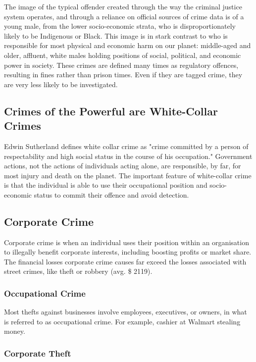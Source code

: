\documentclass{article}
\begin{document}
The image of the typical offender created through the way the criminal justice system operates, and through a reliance on official sources of crime data is of a young male, from the lower socio-economic strata, who is disproportionately likely to be Indigenous or Black. This image is in stark contrast to who is responsible for most physical and economic harm on our planet: middle-aged and older, affluent, white males holding positions of social, political, and economic power in society. These crimes are defined many times as regulatory offences, resulting in fines rather than prison times. Even if they are tagged crime, they are very less likely to be investigated.

\subsection{Crimes of the Powerful are White-Collar Crimes}

Edwin Sutherland defines white collar crime as "crime committed by a person of respectability and high social status in the course of his occupation." Government actions, not the actions of individuals acting alone, are responsible, by far, for most injury and death on the planet. The important feature of white-collar crime is that the individual is able to use their occupational position and socio-economic status to commit their offence and avoid detection.

\subsection{Corporate Crime}

Corporate crime is when an individual uses their position within an organisation to illegally benefit corporate interests, including boosting profits or market share. The financial losses corporate crime causes far exceed the losses associated with street crimes, like theft or robbery (avg. \$ 2119). 

\subsubsection*{Occupational Crime}

Most thefts against businesses involve employees, executives, or owners, in what is referred to as occupational crime. For example, cashier at Walmart stealing money.

\subsubsection*{Corporate Theft}
\end{document}
